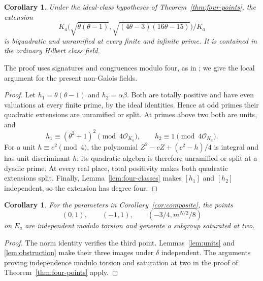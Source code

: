 \documentclass[11pt,leqno,oneside,letterpaper]{amsart}
\newtheorem{corollary}[theorem]{Corollary}
\theoremstyle{remark}
\numberwithin{equation}{section}
\begin{document}
\begin{samepage}
  \begin{corollary}\label{cor:hilbert}
    Under the ideal-class hypotheses of Theorem~\ref{thm:four-points}, the extension
    \[
      K_a\bigl(\sqrt{\theta(\theta-1)},\sqrt{(4\theta-3)(16\theta-15)}\bigr)/K_a
    \]
    is biquadratic and unramified at every finite and infinite prime. It is contained in the ordinary Hilbert class field.
  \end{corollary}
\end{samepage}

The proof uses signatures and congruences modulo four, as in \cite[\S I.6(b--c) and Proposition I.5]{GrasGras1975}; we give the local argument for the present non-Galois fields.

\begin{proof}
  Let $h_1=\theta(\theta-1)$ and $h_2=\alpha\beta$. Both are totally positive and have even valuations at every finite prime, by the ideal identities. Hence at odd primes their quadratic extensions are unramified or split. At primes above two both are units, and
  \[
    h_1\equiv(\theta^2+1)^2\pmod{4\mathcal O_{K_a}},\qquad
    h_2\equiv1\pmod{4\mathcal O_{K_a}}.
  \]
  For a unit $h\equiv c^2\pmod4$, the polynomial $Z^2-cZ+(c^2-h)/4$ is integral and has unit discriminant $h$; its quadratic algebra is therefore unramified or split at a dyadic prime. At every real place, total positivity makes both quadratic extensions split. Finally, Lemma~\ref{lem:four-classes} makes $[h_1]$ and $[h_2]$ independent, so the extension has degree four.
\end{proof}

\begin{samepage}
  \begin{corollary}\label{cor:three-points}
    For the parameters in Corollary~\ref{cor:composite}, the points
    \[
      (0,1),\qquad (-1,1),\qquad (-3/4,m^{N/2}/8)
    \]
    on $E_a$ are independent modulo torsion and generate a subgroup saturated at two.
  \end{corollary}
\end{samepage}

\begin{proof}
  The norm identity verifies the third point. Lemmas~\ref{lem:units} and \ref{lem:obstruction} make their three images under $\delta$ independent. The arguments proving independence modulo torsion and saturation at two in the proof of Theorem~\ref{thm:four-points} apply.
\end{proof}
\end{document}
